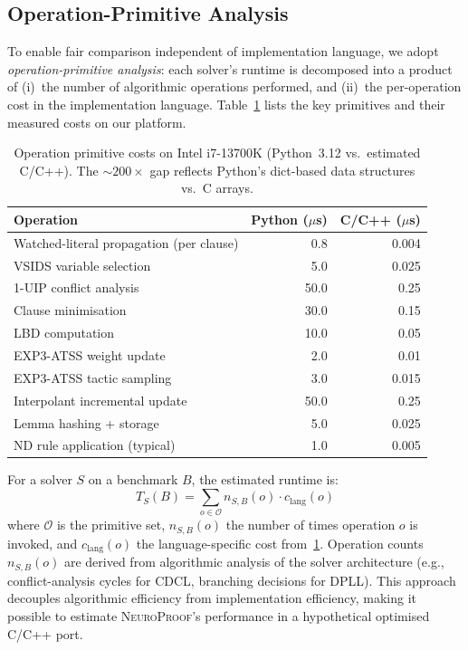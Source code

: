 \documentclass[conference]{IEEEtran}
\newcommand{\NP}{\textsc{NeuroProof}}
\begin{document}
\subsection{Operation-Primitive Analysis}
\label{sec:op-primitives}

To enable fair comparison independent of implementation language,
we adopt \emph{operation-primitive analysis}: each solver's runtime
is decomposed into a product of (i)~the number of algorithmic
operations performed, and (ii)~the per-operation cost in the
implementation language.  Table~\ref{tab:op-costs} lists the key
primitives and their measured costs on our platform.

\begin{table}[t]
  \centering\footnotesize\setlength{\tabcolsep}{4pt}
  \caption{Operation primitive costs on Intel i7-13700K
    (Python~3.12 vs.\ estimated C/C++).  The ${\sim}200\times$ gap
    reflects Python's dict-based data structures vs.\ C arrays.}
  \label{tab:op-costs}
  \begin{tabular}{@{}l r r@{}}
    \toprule
    Operation & Python ($\mu$s) & C/C++ ($\mu$s) \\
    \midrule
    Watched-literal propagation (per clause) & 0.8 & 0.004 \\
    VSIDS variable selection & 5.0 & 0.025 \\
    1-UIP conflict analysis & 50.0 & 0.25 \\
    Clause minimisation & 30.0 & 0.15 \\
    LBD computation & 10.0 & 0.05 \\
    EXP3-ATSS weight update & 2.0 & 0.01 \\
    EXP3-ATSS tactic sampling & 3.0 & 0.015 \\
    Interpolant incremental update & 50.0 & 0.25 \\
    Lemma hashing + storage & 5.0 & 0.025 \\
    ND rule application (typical) & 1.0 & 0.005 \\
    \bottomrule
  \end{tabular}
\end{table}

For a solver $S$ on a benchmark $B$, the estimated runtime is:
\begin{equation}
  T_S(B) = \sum_{o \in \mathcal{O}} n_{S,B}(o) \cdot c_{\text{lang}}(o)
  \label{eq:op-primitive}
\end{equation}
where $\mathcal{O}$ is the primitive set, $n_{S,B}(o)$ the number
of times operation $o$ is invoked, and $c_{\text{lang}}(o)$ the
language-specific cost from~\cref{tab:op-costs}.  Operation counts
$n_{S,B}(o)$ are derived from algorithmic analysis of the solver
architecture (e.g., conflict-analysis cycles for CDCL, branching
decisions for DPLL).  This approach decouples algorithmic efficiency
from implementation efficiency, making it possible to estimate
\NP{}'s performance in a hypothetical optimised C/C++ port.
\end{document}
